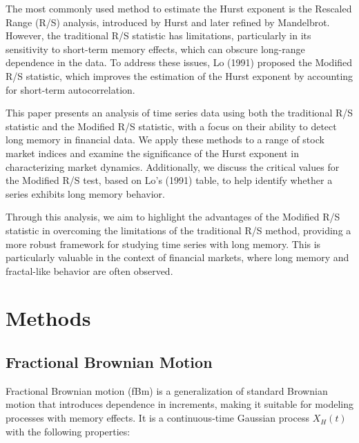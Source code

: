 \documentclass[11pt]{extarticle}
\begin{document}
The most commonly used method to estimate the Hurst exponent is the Rescaled Range (R/S) analysis, introduced by Hurst and later refined by Mandelbrot. However, the traditional R/S statistic has limitations, particularly in its sensitivity to short-term memory effects, which can obscure long-range dependence in the data. To address these issues, Lo (1991) proposed the Modified R/S statistic, which improves the estimation of the Hurst exponent by accounting for short-term autocorrelation.

This paper presents an analysis of time series data using both the traditional R/S statistic and the Modified R/S statistic, with a focus on their ability to detect long memory in financial data. We apply these methods to a range of stock market indices and examine the significance of the Hurst exponent in characterizing market dynamics. Additionally, we discuss the critical values for the Modified R/S test, based on Lo’s (1991) table, to help identify whether a series exhibits long memory behavior.

Through this analysis, we aim to highlight the advantages of the Modified R/S statistic in overcoming the limitations of the traditional R/S method, providing a more robust framework for studying time series with long memory. This is particularly valuable in the context of financial markets, where long memory and fractal-like behavior are often observed.



\section{Methods}

\subsection{Fractional Brownian Motion}

Fractional Brownian motion (fBm) is a generalization of standard Brownian motion that introduces dependence in increments, making it suitable for modeling processes with memory effects. It is a continuous-time Gaussian process \( X_H(t) \) with the following properties:
\end{document}
